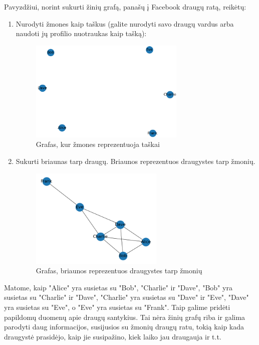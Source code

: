 \documentclass{VUMIFPSkursinis}
\begin{document}
 Pavyzdžiui, norint sukurti žinių grafą, panašų į Facebook draugų ratą, reikėtų:
\begin{enumerate}
\item Nurodyti žmones kaip taškus (galite nurodyti savo draugų vardus arba naudoti jų profilio nuotraukas kaip tašką):

\begin{figure}[htbp]
  \centering
  \includegraphics[width=0.7\textwidth]{img/nodes.png}
  \caption{Grafas, kur žmones reprezentuoja taškai}
  \label{fig:sample_image}
\end{figure}

\item Sukurti briaunas tarp draugų. Briaunos reprezentuos draugystes tarp žmonių. 
\begin{figure}[htbp]
  \centering
  \includegraphics[width=0.6\textwidth]{img/vertex.png}
  \caption{Grafas, briaunos reprezentuos draugystes tarp žmonių}
  \label{fig:sample_image}
\end{figure}
\end{enumerate}

Matome, kaip "Alice" yra susietas su "Bob", "Charlie" ir "Dave", "Bob" yra susietas su "Charlie" ir "Dave", "Charlie" yra susietas su "Dave" ir "Eve", "Dave" yra susietas su "Eve", o "Eve" yra susietas su "Frank". Taip galime pridėti papildomų duomenų apie draugų santykius. Tai nėra žinių grafų riba ir galima parodyti daug informacijos, susijusios su žmonių draugų ratu, tokią kaip kada draugystė prasidėjo, kaip jie susipažino, kiek laiko jau draugauja ir t.t.
\end{document}
